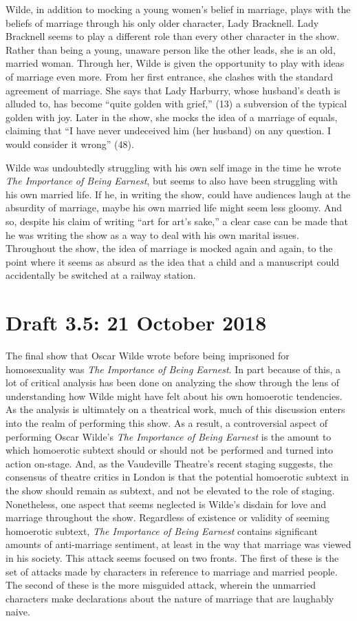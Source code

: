 \documentclass[12pt]{article}[titlepage]
\newcommand{\say}[1]{``#1''}
\newcommand{\1}{\={a}}
\newcommand{\2}{\={e}}
\newcommand{\3}{\={\i}}
\newcommand{\4}{\=o}
\newcommand{\5}{\=u}
\newcommand{\6}{\={A}}
\renewcommand{\,}{\textsuperscript{,}}
\begin{document}
Wilde, in addition to mocking a young women's belief in marriage, plays with the beliefs of marriage through his only older character, Lady Bracknell.
Lady Bracknell seems to play a different role than every other character in the show.
Rather than being a young, unaware person like the other leads, she is an old, married woman.
Through her, Wilde is given the opportunity to play with ideas of marriage even more.
From her first entrance, she clashes with the standard agreement of marriage.
She says that Lady Harburry, whose husband's death is alluded to, has become \say{quite golden with grief,} (13) a subversion of the typical golden with joy.
Later in the show, she mocks the idea of a marriage of equals, claiming that \say{I have never undeceived him (her husband) on any question. I would consider it wrong} (48).

Wilde was undoubtedly struggling with his own self image in the time he wrote \textit{The Importance of Being Earnest}, but seems to also have been struggling with his own married life.
If he, in writing the show, could have audiences laugh at the absurdity of marriage, maybe his own married life might seem less gloomy.
And so, despite his claim of writing \say{art for art's sake,} a clear case can be made that he was writing the show as a way to deal with his own marital issues.
Throughout the show, the idea of marriage is mocked again and again, to the point where it seems as absurd as the idea that a child and a manuscript could accidentally be switched at a railway station.

\section{Draft 3.5: 21 October 2018}
The final show that Oscar Wilde wrote before being imprisoned for homosexuality was \textit{The Importance of Being Earnest}.
In part because of this, a lot of critical analysis has been done on analyzing the show through the lens of understanding how Wilde might have felt about his own homoerotic tendencies.
As the analysis is ultimately on a theatrical work, much of this discussion enters into the realm of performing this show.
As a result, a controversial aspect of performing Oscar Wilde's \textit{The Importance of Being Earnest} is the amount to which homoerotic subtext should or should not be performed and turned into action on-stage.
And, as the Vaudeville Theatre's recent staging suggests, the consensus of theatre critics in London is that the potential homoerotic subtext in the show should remain as subtext, and not be elevated to the role of staging.
Nonetheless, one aspect that seems neglected is Wilde's disdain for love and marriage throughout the show.
Regardless of existence or validity of seeming homoerotic subtext, \textit{The Importance of Being Earnest} contains significant amounts of anti-marriage sentiment, at least in the way that marriage was viewed in his society.
This attack seems focused on two fronts.
The first of these is the set of attacks made by characters in reference to marriage and married people.
The second of these is the more misguided attack, wherein the unmarried characters make declarations about the nature of marriage that are laughably naive.
\end{document}
